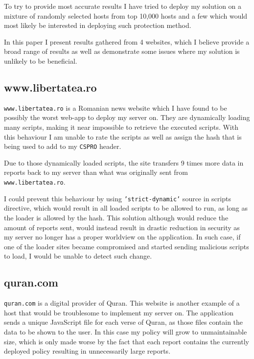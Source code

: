 To try to provide most accurate results I have tried to deploy my solution on a mixture of randomly selected hosts from top 10,000 hosts and a few which would most likely be interested in deploying such protection method.

In this paper I present results gathered from 4 websites, which I believe provide a broad range of results as well as demonstrate some issues where my solution is unlikely to be beneficial.


\subsection{www.libertatea.ro}

\texttt{www.libertatea.ro} is a Romanian news website which I have found to be possibly the worst web-app to deploy my server on.
They are dynamically loading many scripts, making it near impossible to retrieve the executed scripts.
With this behaviour I am unable to rate the scripts as well as assign the hash that is being used to add to my \texttt{CSPRO} header.

Due to those dynamically loaded scripts, the site transfers 9 times more data in reports back to my server than what was originally sent from \texttt{www.libertatea.ro}.

I could prevent this behaviour by using \texttt{'strict-dynamic'} source in scripts directive, which would result in all loaded scripts to be allowed to run, as long as the loader is allowed by the hash.
This solution although would reduce the amount of reports sent, would instead result in drastic reduction in security as my server no longer has a proper worldview on the application.
In such case, if one of the loader sites became compromised and started sending malicious scripts to load, I would be unable to detect such change.

\subsection{quran.com}

\texttt{quran.com} is a digital provider of Quran. 
This website is another example of a host that would be troublesome to implement my server on.
The application sends a unique JavaScript file for each verse of Quran, as those files contain the data to be shown to the user.
In this case my policy will grow to unmaintainable size, which is only made worse by the fact that each report contains the currently deployed policy resulting in unnecessarily large reports.

